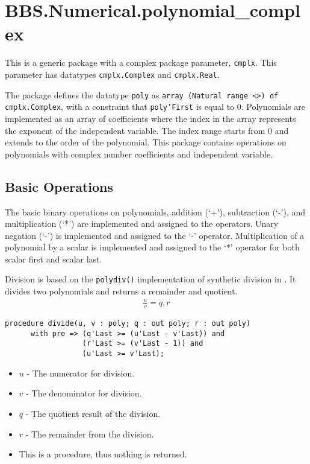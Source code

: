 \documentclass[10pt, openany]{book}
\newcommand{\function}[1]{\texttt{#1}}
\newcommand{\datatype}[1]{\texttt{#1}}
\begin{document}
\section{BBS.Numerical.polynomial\_complex}
This is a generic package with a complex package parameter, \datatype{cmplx}.  This parameter has datatypes \datatype{cmplx.Complex} and \datatype{cmplx.Real}.

The package defines the datatype \datatype{poly} as \datatype{array (Natural range  <>) of cmplx.Complex}, with a constraint that \datatype{poly'First} is equal to 0.  Polynomials are implemented as an array of coefficients where the index in the array represents the exponent of the independent variable.  The index range starts from 0 and extends to the order of the polynomial.  This package contains operations on polynomials with complex number coefficients and independent variable.

\subsection{Basic Operations}
The basic binary operations on polynomials, addition (`+'), subtraction (`-'), and multiplication (`*') are implemented and assigned to the operators.  Unary negation (`-') is implemented and assigned to the `-' operator.  Multiplication of a polynomial by a scalar is implemented and assigned to the `*' operator for both scalar first and scalar last.

Division is based on the \function{polydiv()} implementation of synthetic division in \cite{NR-C}.  It divides two polynomials and returns a remainder and quotient.
\begin{align*}
  \frac{u}{v} = q, r
\end{align*}
\begin{lstlisting}
procedure divide(u, v : poly; q : out poly; r : out poly)
      with pre => (q'Last >= (u'Last - v'Last)) and
                  (r'Last >= (v'Last - 1)) and
                  (u'Last >= v'Last);
\end{lstlisting}
\begin{itemize}
  \item $u$ - The numerator for division.
  \item $v$ - The denominator for division.
  \item $q$ - The quotient result of the division.
  \item $r$ - The remainder from the division.
  \item This is a procedure, thus nothing is returned.
\end{itemize}
\end{document}
